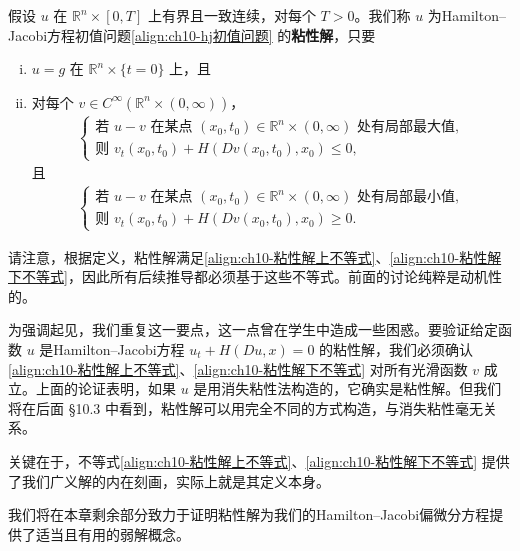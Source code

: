 \documentclass[../../main.tex]{subfiles}
\begin{document}
\begin{definition}\label{definition:ch10-粘性解}
假设 $u$ 在 $\mathbb{R}^n\times[0,T]$ 上有界且一致连续，对每个 $T>0$。我们称 $u$ 为Hamilton--Jacobi方程初值问题\eqref{align:ch10-hj初值问题} 的\textbf{粘性解}，只要
\begin{enumerate}[(i)]
\item $u=g$ 在 $\mathbb{R}^n\times\{t=0\}$ 上，且
\item 对每个 $v\in C^\infty(\mathbb{R}^n\times(0,\infty))$，
\begin{align}
\begin{cases}
\text{若 } u-v \text{ 在某点 } (x_0,t_0)\in\mathbb{R}^n\times(0,\infty) \text{ 处有局部最大值},\\
\text{则 } v_t(x_0,t_0)+H(Dv(x_0,t_0),x_0)\leqslant 0,
\end{cases}
\label{align:ch10-粘性解上不等式}
\end{align}
且
\begin{align}
\begin{cases}
\text{若 } u-v \text{ 在某点 } (x_0,t_0)\in\mathbb{R}^n\times(0,\infty) \text{ 处有局部最小值},\\
\text{则 } v_t(x_0,t_0)+H(Dv(x_0,t_0),x_0)\geqslant 0.
\end{cases}
\label{align:ch10-粘性解下不等式}
\end{align}
\end{enumerate}
\end{definition}

\begin{remark}\label{remark:ch10-粘性解注意}
请注意，根据定义，粘性解满足\eqref{align:ch10-粘性解上不等式}、\eqref{align:ch10-粘性解下不等式}，因此所有后续推导都必须基于这些不等式。前面的讨论纯粹是动机性的。

为强调起见，我们重复这一要点，这一点曾在学生中造成一些困惑。要验证给定函数 $u$ 是Hamilton--Jacobi方程 $u_t+H(Du,x)=0$ 的粘性解，我们必须确认\eqref{align:ch10-粘性解上不等式}、\eqref{align:ch10-粘性解下不等式} 对所有光滑函数 $v$ 成立。上面的论证表明，如果 $u$ 是用消失粘性法构造的，它确实是粘性解。但我们将在后面 \S10.3 中看到，粘性解可以用完全不同的方式构造，与消失粘性毫无关系。

关键在于，不等式\eqref{align:ch10-粘性解上不等式}、\eqref{align:ch10-粘性解下不等式} 提供了我们广义解的内在刻画，实际上就是其定义本身。

我们将在本章剩余部分致力于证明粘性解为我们的Hamilton--Jacobi偏微分方程提供了适当且有用的弱解概念。
\end{remark}
\end{document}
